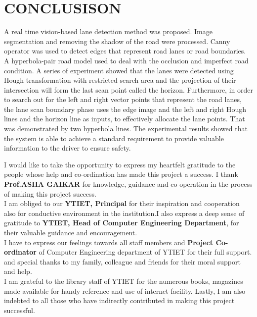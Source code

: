 \documentclass[oneside,a4paper,12pt]{report}
\begin{document}
\chapter{CONCLUSISON}
A real time vision-based lane detection method was proposed. Image segmentation and removing the shadow of the road were processed. Canny operator was used to detect edges that represent road lanes or road boundaries. A hyperbola-pair road model used to deal with the occlusion and imperfect road condition. A series of experiment showed that the lanes were detected using Hough transformation with restricted search area and the projection of their intersection will form the last scan point called the horizon. Furthermore, in order to search out for the left and right vector points that represent the road lanes, the lane scan boundary phase uses the edge image and the left and right Hough lines and the horizon line as inputs, to effectively allocate the lane points. That was demonstrated by two hyperbola lines. The experimental results showed that the system is able to achieve a standard requirement to provide valuable information to the driver to ensure safety.
{  } 

I would like to take the opportunity to express my heartfelt gratitude to the people whose help and co-ordination has made this project a success. I thank \textbf{Prof.ASHA GAIKAR} for knowledge, guidance and co-operation in the process of making this project success.\\

 I am obliged to our \textbf{YTIET, Principal} for their inspiration and cooperation also for conductive environment in the institution.I also express a deep sense of gratitude to \textbf{YTIET, Head of Computer Engineering Department}, for their valuable guidance and encouragement.\\

 I have to express our feelings towards all staff members and \textbf{Project Co-ordinator} of Computer Engineering department of YTIET for their full support. and special thanks to my family, colleague and friends for their moral support and help.\\

I am grateful to the library staff of YTIET for the numerous books, magazines made available for handy reference and use of internet facility. Lastly, I am also indebted to all those who have indirectly contributed in making this project successful.
\vspace{50mm} 
\end{document}
